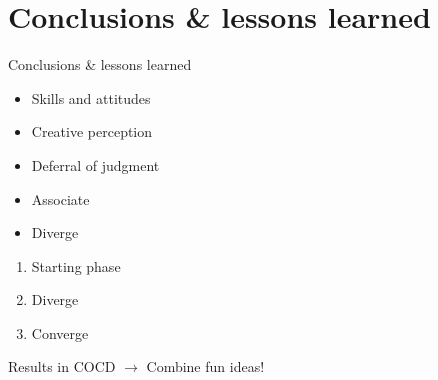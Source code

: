 \documentclass[notes]{beamer}
\begin{document}
\section{Conclusions \& lessons learned}
\begin{frame}{Conclusions \& lessons learned}
	
\begin{itemize}
	\item Skills and attitudes
	\item Creative perception
	\item Deferral of judgment
	\item Associate
	\item Diverge
\end{itemize}
 \begin{enumerate}
 \item Starting phase
 \item Diverge
 \item Converge
 \end{enumerate}
Results in COCD
$\rightarrow$ Combine fun ideas!
	
\end{frame}



\end{document}
